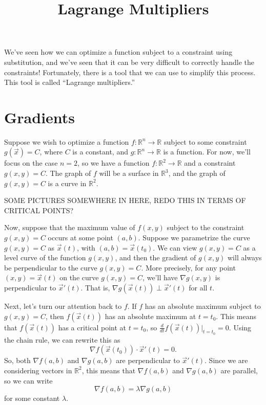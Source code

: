 \documentclass{ximera}
\title{Lagrange Multipliers}
\begin{document}
\begin{abstract}
\end{abstract}
\maketitle

We've seen how we can optimize a function subject to a constraint using substitution, and we've seen that it can be very difficult to correctly handle the constraints! Fortunately, there is a tool that we can use to simplify this process. This tool is called ``Lagrange multipliers.''

\section*{Gradients}

Suppose we wish to optimize a function $f:\mathbb{R}^n\rightarrow\mathbb{R}$ subject to some constraint $g(\vec{x}) = C$, where $C$ is a constant, and $g:\mathbb{R}^n\rightarrow\mathbb{R}$ is a function. For now, we'll focus on the case $n=2$, so we have a function $f:\mathbb{R}^2\rightarrow\mathbb{R}$ and a constraint $g(x,y) = C$. The graph of $f$ will be a surface in $\mathbb{R}^3$, and the graph of $g(x,y) = C$ is a curve in $\mathbb{R}^2$.

SOME PICTURES SOMEWHERE IN HERE, REDO THIS IN TERMS OF CRITICAL POINTS?

Now, suppose that the maximum value of $f(x,y)$ subject to the constraint $g(x,y)=C$ occurs at some point $(a,b)$. Suppose we parametrize the curve $g(x,y)=C$ as $\vec{x}(t)$, with $(a,b)=\vec{x}(t_0)$. We can view $g(x,y)=C$ as a level curve of the function $g(x,y)$, and then the gradient of $g(x,y)$ will always be perpendicular to the curve $g(x,y)=C$. More precisely, for any point $(x,y) = \vec{x}(t)$ on the curve $g(x,y)=C$, we'll have $\nabla g(x,y)$ is perpendicular to $\vec{x}'(t)$. That is, $\nabla g(\vec{x}(t))\perp \vec{x}'(t)$ for all $t$.

Next, let's turn our attention back to $f$. If $f$ has an absolute maximum subject to $g(x,y)=C$, then $f(\vec{x}(t))$ has an absolute maximum at $t=t_0$. This means that $f(\vec{x}(t))$ has a critical point at $t=t_0$, so $\frac{d}{dt}f(\vec{x}(t))|_{t=t_0}=0$. Using the chain rule, we can rewrite this as
\[
\nabla f(\vec{x}(t_0))\cdot \vec{x}'(t)=0.
\]
So, both $\nabla f(a,b)$ and $\nabla g(a,b)$ are perpendicular to $\vec{x}'(t)$. Since we are considering vectors in $\mathbb{R}^2$, this means that $\nabla f(a,b)$ and $\nabla g(a,b)$ are parallel, so we can write
\[
\nabla f(a,b) = \lambda \nabla g(a,b)
\]
for some constant $\lambda$.
\end{document}
